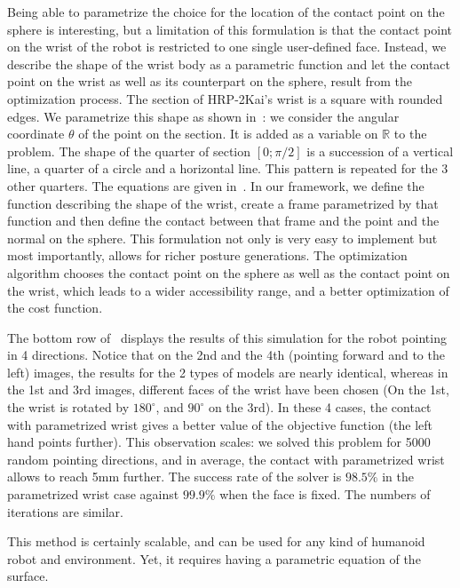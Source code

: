 Being able to parametrize the choice for the location of the contact point on the sphere is interesting, but a limitation of this formulation is that the contact point on the wrist of the robot is restricted to one single user-defined face.
Instead, we describe the shape of the wrist body as a parametric function and let the contact point on the wrist as well as its counterpart on the sphere, result from the optimization process.
The section of HRP-2Kai's wrist is a square with rounded edges.
We parametrize this shape as shown in~:
we consider the angular coordinate $\theta$ of the point on the section.
It is added as a variable on $\mathbb{R}$ to the problem.
The shape of the quarter of section $[0;\pi/2]$ is a succession of a vertical line, a quarter of a circle and a horizontal line.
This pattern is repeated for the 3 other quarters.
The equations are given in~.
In our framework, we define the function describing the shape of the wrist, create a frame parametrized by that function and then define the contact between that frame and the point and the normal on the sphere.
This formulation not only is very easy to implement but most importantly, allows for richer posture generations.
The optimization algorithm chooses the contact point on the sphere as well as the contact point on the wrist, which leads to a wider accessibility range, and a better optimization of the cost function.

The bottom row of~ displays the results of this simulation for the robot pointing in 4 directions.
Notice that on the 2nd and the 4th (pointing forward and to the left) images, the results for the 2 types of models are nearly identical, whereas in the 1st and 3rd images, different faces of the wrist have been chosen (On the 1st, the wrist is rotated by $180^{\circ}$, and $90^{\circ}$ on the 3rd).
In these 4 cases, the contact with parametrized wrist gives a better value of the objective function (the left hand points further).
This observation scales:
we solved this problem for 5000 random pointing directions, and in average, the contact with parametrized wrist allows to reach 5mm further.
The success rate of the solver is $98.5\%$ in the parametrized wrist case against $99.9\%$ when the face is fixed.
The numbers of iterations are similar.

This method is certainly scalable, and can be used for any kind of humanoid robot and environment.
Yet, it requires having a parametric equation of the surface.

